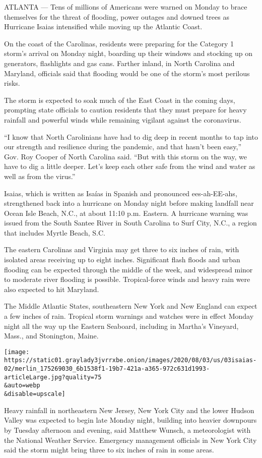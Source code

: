 ATLANTA --- Tens of millions of Americans were warned on Monday to brace
themselves for the threat of flooding, power outages and downed trees as
Hurricane Isaias intensified while moving up the Atlantic Coast.

On the coast of the Carolinas, residents were preparing for the Category
1 storm's arrival on Monday night, boarding up their windows and
stocking up on generators, flashlights and gas cans. Farther inland, in
North Carolina and Maryland, officials said that flooding would be one
of the storm's most perilous risks.

The storm is expected to soak much of the East Coast in the coming days,
prompting state officials to caution residents that they must prepare
for heavy rainfall and powerful winds while remaining vigilant against
the coronavirus.

``I know that North Carolinians have had to dig deep in recent months to
tap into our strength and resilience during the pandemic, and that
hasn't been easy,'' Gov. Roy Cooper of North Carolina said. ``But with
this storm on the way, we have to dig a little deeper. Let's keep each
other safe from the wind and water as well as from the virus.''

Isaias, which is written as Isaías in Spanish and pronounced
ees-ah-EE-ahs, strengthened back into a hurricane on Monday night before
making landfall near Ocean Isle Beach, N.C., at about 11:10 p.m.
Eastern. A hurricane warning was issued from the South Santee River in
South Carolina to Surf City, N.C., a region that includes Myrtle Beach,
S.C.

The eastern Carolinas and Virginia may get three to six inches of rain,
with isolated areas receiving up to eight inches. Significant flash
floods and urban flooding can be expected through the middle of the
week, and widespread minor to moderate river flooding is possible.
Tropical-force winds and heavy rain were also expected to hit Maryland.

The Middle Atlantic States, southeastern New York and New England can
expect a few inches of rain. Tropical storm warnings and watches were in
effect Monday night all the way up the Eastern Seaboard, including in
Martha's Vineyard, Mass., and Stonington, Maine.

\texttt{[image: https://static01.graylady3jvrrxbe.onion/images/2020/08/03/us/03isaias-02/merlin\_175269030\_6b1538f1-19b7-421a-a365-972c631d1993-articleLarge.jpg?quality=75\\\&auto=webp\\\&disable=upscale]}

Heavy rainfall in northeastern New Jersey, New York City and the lower
Hudson Valley was expected to begin late Monday night, building into
heavier downpours by Tuesday afternoon and evening, said Matthew Wunsch,
a meteorologist with the National Weather Service. Emergency management
officials in New York City said the storm might bring three to six
inches of rain in some areas.


